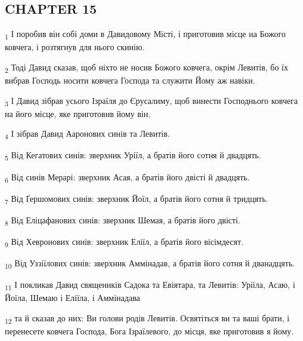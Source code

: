\subsection{CHAPTER 15}
\begin{tcolorbox}
\textsubscript{1} І поробив він собі доми в Давидовому Місті, і приготовив місце на Божого ковчега, і розтягнув для нього скинію.
\end{tcolorbox}
\begin{tcolorbox}
\textsubscript{2} Тоді Давид сказав, щоб ніхто не носив Божого ковчега, окрім Левитів, бо їх вибрав Господь носити ковчега Господа та служити Йому аж навіки.
\end{tcolorbox}
\begin{tcolorbox}
\textsubscript{3} І Давид зібрав усього Ізраїля до Єрусалиму, щоб винести Господнього ковчега на його місце, яке приготовив йому він.
\end{tcolorbox}
\begin{tcolorbox}
\textsubscript{4} І зібрав Давид Ааронових синів та Левитів.
\end{tcolorbox}
\begin{tcolorbox}
\textsubscript{5} Від Кегатових синів: зверхник Уріїл, а братів його сотня й двадцять.
\end{tcolorbox}
\begin{tcolorbox}
\textsubscript{6} Від синів Мерарі: зверхник Асая, а братів його двісті й двадцять.
\end{tcolorbox}
\begin{tcolorbox}
\textsubscript{7} Від Ґершомових синів: зверхник Йоїл, а братів його сотня й тридцять.
\end{tcolorbox}
\begin{tcolorbox}
\textsubscript{8} Від Еліцафанових синів: зверхник Шемая, а братів його двісті.
\end{tcolorbox}
\begin{tcolorbox}
\textsubscript{9} Від Хевронових синів: зверхник Еліїл, а братів його вісімдесят.
\end{tcolorbox}
\begin{tcolorbox}
\textsubscript{10} Від Уззіїлових синів: зверхник Аммінадав, а братів його сотня й дванадцять.
\end{tcolorbox}
\begin{tcolorbox}
\textsubscript{11} І покликав Давид священиків Садока та Евіятара, та Левитів: Уріїла, Асаю, і Йоїла, Шемаю і Еліїла, і Аммінадава
\end{tcolorbox}
\begin{tcolorbox}
\textsubscript{12} та й сказав до них: Ви голови родів Левитів. Освятіться ви та ваші брати, і перенесете ковчега Господа, Бога Ізраїлевого, до місця, яке приготовив я йому.
\end{tcolorbox}
